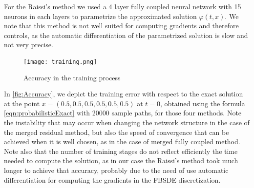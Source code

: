 For the Raissi's method we used a 4 layer fully coupled neural network with 15 neurons in each layers to parametrize the approximated solution $\varphi(t,x)$. We note that this method is not well suited for computing gradients and therefore controls, as the automatic differentiation of the parametrized solution is slow and not very precise.

 \begin{figure}[htb!]		
 		\texttt{[image: training.png]}
 	\caption{Accuracy in the training process}
 	\label{fig:Accuracy}
 \end{figure}

In \autoref{fig:Accuracy}, we depict the training error with respect to the exact solution at the point $x=(0.5,0.5,0.5,0.5,0.5,0.5)$ at $t=0$, obtained using the formula \eqref{eqn:probabilisticExact} with 20000 sample paths, for those four methods. Note the instability that may occur when changing the network structure in the case of the merged residual method, but also the speed of convergence that can be achieved when it is well chosen, as in the case of merged fully coupled method. Note also that the number of training stages do not reflect efficiently the time needed to compute the solution, as in our case the Raissi's method took much longer to achieve that accuracy, probably due to the need of use automatic differentiation for computing the gradients in the FBSDE discretization. 
 
